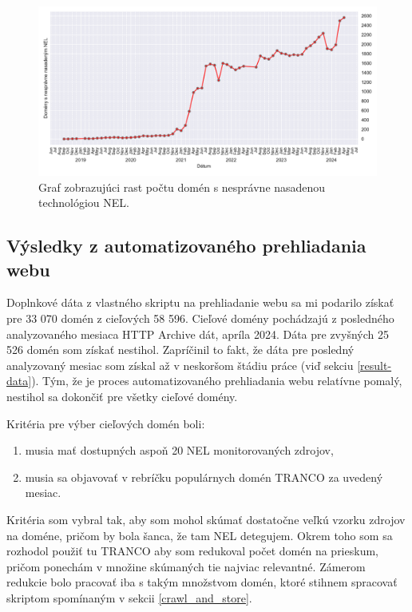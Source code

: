 \begin{figure}[!htb]
\begin{center}
 \includegraphics[scale=0.59]{obrazky-figures/httparchive_nel_deployment_incorrect.pdf}
 \caption{Graf zobrazujúci rast počtu domén s nesprávne nasadenou technológiou NEL.}
 \label{fig:httparchive-nel-deployment-incorrect}
\end{center}
\end{figure}

\pagebreak


\subsection{Výsledky z automatizovaného prehliadania webu}
\label{crawling-results}

Doplnkové dáta z vlastného skriptu na prehliadanie webu sa mi podarilo získať pre 33 070 domén z cieľových 58 596. 
Cieľové domény pochádzajú z posledného analyzovaného mesiaca HTTP Archive dát, apríla 2024.
Dáta pre zvyšných 25 526 domén som získať nestihol.
Zapríčinil to fakt, že dáta pre posledný analyzovaný mesiac som získal až v neskoršom štádiu práce (viď sekciu \ref{result-data}).
Tým, že je proces automatizovaného prehliadania webu relatívne pomalý, nestihol sa dokončiť pre všetky cieľové domény. 

\noindent Kritéria pre výber cieľových domén boli:
\begin{enumerate}
    \item musia mať dostupných aspoň 20 NEL monitorovaných zdrojov,
    \item musia sa objavovať v rebríčku populárnych domén TRANCO za uvedený mesiac.
\end{enumerate}
Kritéria som vybral tak, aby som mohol skúmať dostatočne veľkú vzorku zdrojov na doméne, pričom by bola šanca, že tam NEL detegujem.
Okrem toho som sa rozhodol použiť tu TRANCO aby som redukoval počet domén na prieskum, pričom ponechám v množine skúmaných tie najviac relevantné.
Zámerom redukcie bolo pracovať iba s takým množstvom domén, ktoré stihnem spracovať skriptom spomínaným v sekcii \ref{crawl_and_store}.

